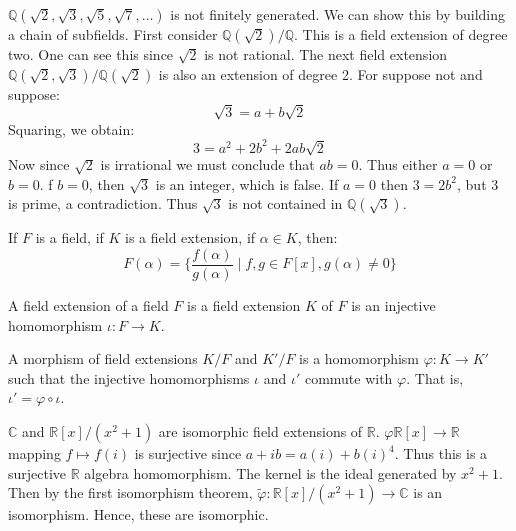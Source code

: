 \documentclass{article}                                                        %
\begin{document}
        \begin{example}
            $\mathbb{Q}(\sqrt{2},\sqrt{3},\sqrt{5},\sqrt{7},\dots)$ is not
            finitely generated. We can show this by building a chain of
            subfields. First consider $\mathbb{Q}(\sqrt{2})/\mathbb{Q}$. This
            is a field extension of degree two. One can see this since
            $\sqrt{2}$ is not rational. The next field extension
            $\mathbb{Q}(\sqrt{2},\sqrt{3})/\mathbb{Q}(\sqrt{2})$ is also an
            extension of degree 2. For suppose not and suppose:
            \begin{equation}
                \sqrt{3}=a+b\sqrt{2}
            \end{equation}
            Squaring, we obtain:
            \begin{equation}
                3=a^{2}+2b^{2}+2ab\sqrt{2}
            \end{equation}
            Now since $\sqrt{2}$ is irrational we must conclude that $ab=0$.
            Thus either $a=0$ or $b=0$. f $b=0$, then $\sqrt{3}$ is an integer,
            which is false. If $a=0$ then $3=2b^{2}$, but $3$ is prime, a
            contradiction. Thus $\sqrt{3}$ is not contained in
            $\mathbb{Q}(\sqrt{3})$.
        \end{example}
        \begin{theorem}
            If $F$ is a field, if $K$ is a field extension, if $\alpha\in{K}$,
            then:
            \begin{equation}
                F(\alpha)=\big\{\frac{f(\alpha)}{g(\alpha)}\;|\;
                    f,g\in{F}[x],g(\alpha)\ne{0}\big\}
            \end{equation}
        \end{theorem}
        \begin{theorem}
            A field extension of a field $F$ is a field extension $K$ of $F$
            is an injective homomorphism $\iota:F\rightarrow{K}$.
        \end{theorem}
        \begin{definition}
            A morphism of field extensions $K/F$ and $K'/F$ is a homomorphism
            $\varphi:K\rightarrow{K}'$ such that the injective homomorphisms
            $\iota$ and $\iota'$ commute with $\varphi$. That is,
            $\iota'=\varphi\circ\iota$.
        \end{definition}
        \begin{example}
            $\mathbb{C}$ and $\mathbb{R}[x]/(x^{2}+1)$ are isomorphic field
            extensions of $\mathbb{R}$.
            $\varphi\mathbb{R}[x]\rightarrow\mathbb{R}$ mapping
            $f\mapsto{f}(i)$ is surjective since $a+ib=a(i)+b(i)^{4}$. Thus this
            is a surjective $\mathbb{R}$ algebra homomorphism. The kernel is
            the ideal generated by $x^{2}+1$. Then by the first isomorphism
            theorem,
            $\tilde{\varphi}:\mathbb{R}[x]/(x^{2}+1)\rightarrow\mathbb{C}$ is an
            isomorphism. Hence, these are isomorphic.
        \end{example}
\end{document}
